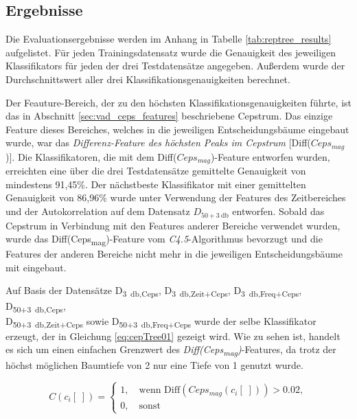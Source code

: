 \subsection{Ergebnisse}
\label{sec:vad_results}

Die Evaluationsergebnisse werden im Anhang in Tabelle \ref{tab:reptree_results} aufgelistet. Für jeden Trainingsdatensatz wurde die Genauigkeit des jeweiligen Klassifikators für jeden der drei Testdatensätze angegeben. Außerdem wurde der Durchschnittswert aller drei Klassifikationsgenauigkeiten berechnet.

Der Feauture-Bereich, der zu den höchsten Klassifikationsgenauigkeiten führte, ist das in Abschnitt \ref{sec:vad_ceps_features} beschriebene Cepstrum. Das einzige Feature dieses Bereiches, welches in die jeweiligen Entscheidungsbäume eingebaut wurde, war das \emph{Differenz-Feature des höchsten Peaks im Cepstrum} [Diff($Ceps_{mag}$)]. Die Klassifikatoren, die mit dem Diff($Ceps_{mag}$)-Feature entworfen wurden, erreichten eine über die drei Testdatensätze gemittelte Genauigkeit von mindestens 91,45\%. Der nächstbeste Klassifikator mit einer gemittelten Genauigkeit von 86,96\% wurde unter Verwendung der Features des Zeitbereiches und der Autokorrelation auf dem Datensatz $D_{50+\SI{3}{\decibel}}$ entworfen. Sobald das Cepstrum in Verbindung mit den Features anderer Bereiche verwendet wurden, wurde das Diff(Ceps\textsubscript{mag})-Feature vom \emph{C4.5}-Algorithmus bevorzugt und die Features der anderen Bereiche nicht mehr in die jeweiligen Entscheidungsbäume mit eingebaut.

Auf Basis der Datensätze D\textsubscript{\SI{3}{\decibel},Ceps}, D\textsubscript{\SI{3}{\decibel},Zeit+Ceps}, D\textsubscript{\SI{3}{\decibel},Freq+Ceps}, D\textsubscript{50+\SI{3}{\decibel},Ceps}, \\ D\textsubscript{50+\SI{3}{\decibel},Zeit+Ceps} sowie D\textsubscript{50+\SI{3}{\decibel},Freq+Ceps} wurde der selbe Klassifikator erzeugt, der in Gleichung \ref{eq:cepTree01} gezeigt wird. Wie zu sehen ist, handelt es sich um einen einfachen Grenzwert des \emph{Diff(Ceps\textsubscript{mag})}-Features, da trotz der höchst möglichen Baumtiefe von 2 nur eine Tiefe von 1 genutzt wurde.

\begin{equation}
C(c_i[\;]) = \begin{cases}
1, \quad \text{wenn  Diff}(Ceps_{mag}(c_i[\;])) > 0.02, \\
0, \quad \text{sonst}
\end{cases}
\label{eq:cepTree01}
\end{equation}


